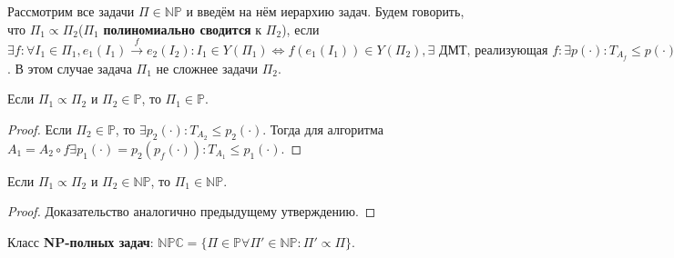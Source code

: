 \documentclass[11pt]{article}
\newcounter{th}\setcounter{th}{0}
\newcounter{stnmt}\setcounter{stnmt}{0}
\def\st{\par\smallskip\refstepcounter{stnmt}\textbf{\arabic{stnmt}}}
\newtheorem*{Statement}{Утверждение \st}
\begin{document}
Рассмотрим все задачи \(\Pi \in \mathbb{NP}\) и введём на нём иерархию задач.
Будем говорить, что \(\Pi_1 \propto \Pi_2\)(\(\Pi_1\) \textbf{полиномиально сводится} к \(\Pi_2\)), если
\(\exists f: \forall I_1 \in \Pi_1, e_1(I_1)\overset{f}{\rightarrow}e_2(I_2): I_1 \in Y(\Pi_1) \Leftrightarrow f(e_1(I_1)) \in Y(\Pi_2), \exists \text{ ДМТ, реализующая } f: \exists p(\cdot): T_{A_f} \leq p(\cdot)\).
В этом случае задача \(\Pi_1\) не сложнее задачи \(\Pi_2\).
\begin{Statement}
Если $\Pi_1 \propto \Pi_2$ и $\Pi_2 \in \mathbb{P}$, то $\Pi_1 \in \mathbb{P}$.
\end{Statement}
\begin{proof}
Если $\Pi_2 \in \mathbb{P}$, то $\exists p_2(\cdot): T_{A_2} \leq p_2(\cdot)$. Тогда для
алгоритма $A_1 = A_2 \circ f \exists p_1(\cdot) = p_2(p_f(\cdot)): T_{A_1} \leq p_1(\cdot)$.
\end{proof}
\begin{Statement}
Если $\Pi_1 \propto \Pi_2$ и $\Pi_2 \in \mathbb{NP}$, то $\Pi_1 \in \mathbb{NP}$.
\end{Statement}
\begin{proof}
Доказательство аналогично предыдущему утверждению.
\end{proof}
Класс \textbf{NP-полных задач}: \(\mathbb{NPC} = \{\Pi \in \mathbb{P} \forall \Pi' \in \mathbb{NP}: \Pi' \propto \Pi\}\).
\end{document}
